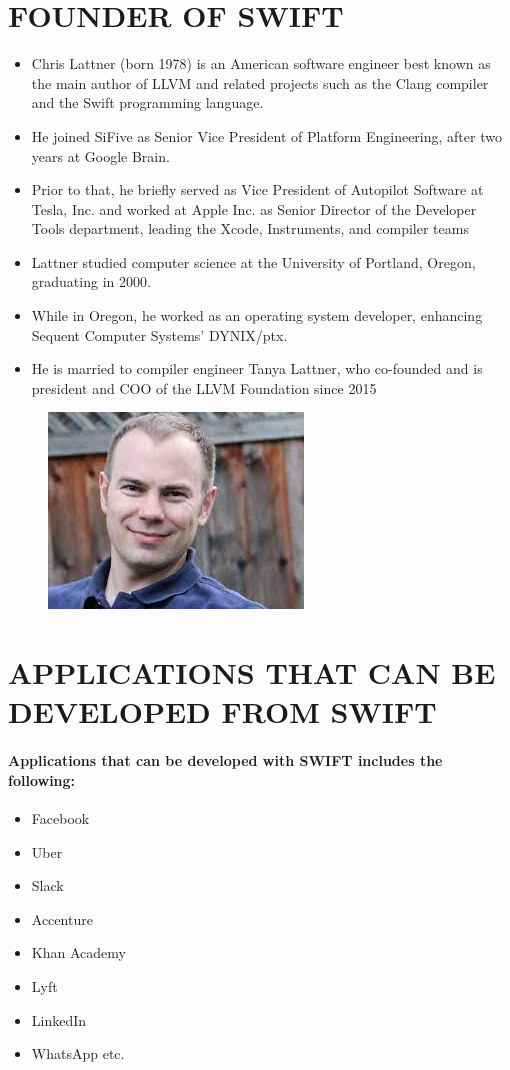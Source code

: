 \documentclass{article}
\begin{document}
\section*{FOUNDER OF SWIFT}
\begin{itemize}
	\item Chris Lattner (born 1978) is an American software engineer best known as the main author of LLVM and related projects such as the Clang compiler and the Swift programming language.
	\item He joined SiFive as Senior Vice President of Platform Engineering, after two years at Google Brain. 
	\item Prior to that, he briefly served as Vice President of Autopilot Software at Tesla, Inc. and worked at Apple Inc. as Senior Director of the Developer Tools department, leading the Xcode, Instruments, and compiler teams
	\item Lattner studied computer science at the University of Portland, Oregon, graduating in 2000. 
	\item While in Oregon, he worked as an operating system developer, enhancing Sequent Computer Systems' DYNIX/ptx. 
	\item He is married to compiler engineer Tanya Lattner, who co-founded and is president and COO of the LLVM Foundation since 2015
\end{itemize}
\begin{figure}
		\begin{center}
	\includegraphics[width=0.4\linewidth]{chris.jpg}
\end{center}
\end{figure}
\newpage
\section*{APPLICATIONS THAT CAN BE DEVELOPED FROM SWIFT}
\paragraph{Applications that can be developed with SWIFT includes the following:
}
\begin{itemize}
	\item Facebook
	\item Uber
	\item Slack
	\item Accenture
	\item Khan Academy
	\item Lyft
	\item LinkedIn
	\item WhatsApp etc.
	
\end{itemize}
\newpage
\end{document}
